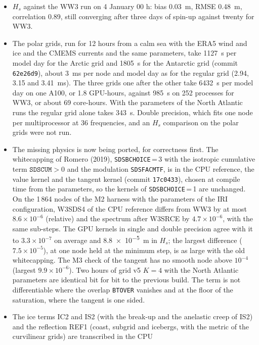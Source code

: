 \documentclass[11pt,a4paper]{article}
\begin{document}
\begin{itemize}
dynamic step and so pays the same sub-steps, but its choice
\texttt{SDSBCHOICE}\,=\,3 may change their number.
\item $H_s$ against the WW3 run on 4 January 00 h: bias \SI{+0.03}{m},
RMSE \SI{0.48}{m}, correlation 0.89, still converging after three days
of spin-up against twenty for WW3.
\item The polar grids, run for 12 hours from a calm sea with the ERA5
wind and ice and the CMEMS currents and the same parameters, take
\SI{1127}{s} per model day for the Arctic grid and \SI{1805}{s} for the
Antarctic grid (commit \texttt{62e26d9}), about \SI{3}{ms} per node and
model day as for the regular grid (2.94, 3.15 and \SI{3.41}{ms}). The
three grids one after the other take \SI{6432}{s} per model day on one
A100, or 1.8 GPU-hours, against \SI{985}{s} on 252 processes for WW3,
or about 69 core-hours. With the parameters of the North Atlantic runs
the regular grid alone takes \SI{343}{s}. Double precision, which fits
one node per multiprocessor at 36 frequencies, and an $H_s$ comparison
on the polar grids were not run.
\item The missing physics is now being ported, for correctness first.
The whitecapping of Romero (2019), \texttt{SDSBCHOICE}\,=\,3 with the
isotropic cumulative term $\texttt{SDSCUM}>0$ and the modulation
\texttt{SDSFACMTF}, is in the CPU reference, the value kernel and the
tangent kernel (commit \texttt{17c0433}), chosen at compile time from
the parameters, so the kernels of \texttt{SDSBCHOICE}\,=\,1 are
unchanged. On the 1\,864 nodes of the M2 harness with the parameters of
the IRI configuration, W3SDS4 of the CPU reference differs from WW3 by
at most $8.6\times10^{-6}$ (relative) and the spectrum after W3SRCE by
$4.7\times10^{-6}$, with the same sub-steps. The GPU kernels in single
and double precision agree with it to $3.3\times10^{-7}$ on average and
\SI{8.8e-5}{m} in $H_s$; the largest difference ($7.5\times10^{-5}$), at
one node held at the minimum step, is as large with the old
whitecapping. The M3 check of the tangent has no smooth node above
$10^{-4}$ (largest $9.9\times10^{-6}$). Two hours of grid v5 $K=4$ with
the North Atlantic parameters are identical bit for bit to the previous
build. The term is not differentiable where the overlap \texttt{BTOVER}
vanishes and at the floor of the saturation, where the tangent is one
sided.
\item The ice terms IC2 and IS2 (with the break-up and the anelastic
creep of IS2) and the reflection REF1 (coast, subgrid and icebergs, with
the metric of the curvilinear grids) are transcribed in the CPU

\end{itemize}
\end{document}
